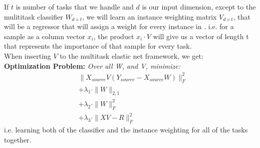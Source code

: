 If $t$ is number of tasks that we handle and $d$ is our input dimension,
except to the mulititask classifier $W_{d \times t}$, we will learn an instance
weighting matrix $V_{d \times t}$, that will be a regressor that will assign a
weight for every instance in . i.e. for a sample as a column vector $x_i$, the
product $x_i\cdot V$ will give us a vector of length t that represents the
importance of that sample for every task. 
\\When inserting $V$ to the multitask
elastic net framework, we get:
\\\textbf{Optimization Problem: }\textit{Over all W, and V, minimize:}
\begin{equation*}
\begin{split}
	&\|X_{source}V(Y_{source} - X_{source}W)\|^2_F 
	\\&+ \lambda_1\cdot\|W\|_{2,1}
	\\&+\lambda_2\cdot\|W\|^2_F
	\\&+\lambda_3\cdot\|XV-R\|^2_F
\end{split}
\end{equation*}
i.e. learning both of the classifier and the instance weighting for all
of the tasks together.